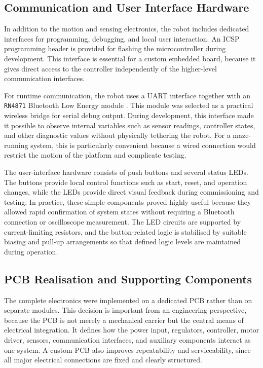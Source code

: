 \subsection{Communication and User Interface Hardware}

In addition to the motion and sensing electronics, the robot includes dedicated interfaces for programming, debugging, and local user interaction. An ICSP programming header is provided for flashing the microcontroller during development. This interface is essential for a custom embedded board, because it gives direct access to the controller independently of the higher-level communication interfaces.

For runtime communication, the robot uses a UART interface together with an \texttt{RN4871} Bluetooth Low Energy module \cite{datasheet_bluetooth}. This module was selected as a practical wireless bridge for serial debug output. During development, this interface made it possible to observe internal variables such as sensor readings, controller states, and other diagnostic values without physically tethering the robot. For a maze-running system, this is particularly convenient because a wired connection would restrict the motion of the platform and complicate testing.

The user-interface hardware consists of push buttons and several status LEDs. The buttons provide local control functions such as start, reset, and operation changes, while the LEDs provide direct visual feedback during commissioning and testing. In practice, these simple components proved highly useful because they allowed rapid confirmation of system states without requiring a Bluetooth connection or oscilloscope measurement. The LED circuits are supported by current-limiting resistors, and the button-related logic is stabilised by suitable biasing and pull-up arrangements so that defined logic levels are maintained during operation.

\subsection{PCB Realisation and Supporting Components}

The complete electronics were implemented on a dedicated PCB rather than on separate modules. This decision is important from an engineering perspective, because the PCB is not merely a mechanical carrier but the central means of electrical integration. It defines how the power input, regulators, controller, motor driver, sensors, communication interfaces, and auxiliary components interact as one system. A custom PCB also improves repeatability and serviceability, since all major electrical connections are fixed and clearly structured.

